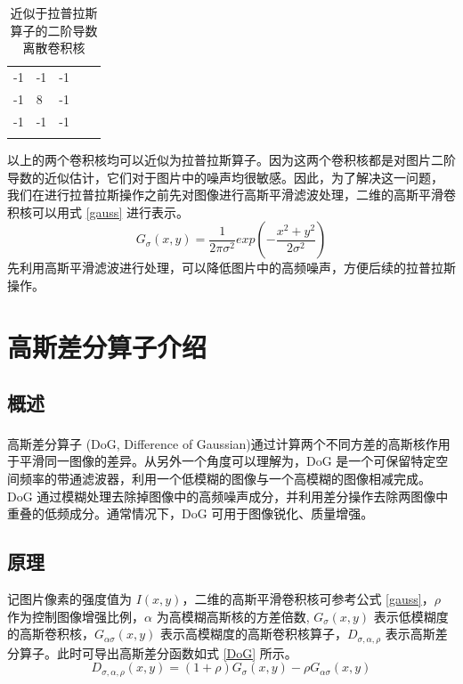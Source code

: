 \documentclass[12pt, a4paper, oneside]{ctexbook}
\begin{document}
	\begin{table}[h]
		\centering
		\begin{tabular}{lllll}
			\cline{1-3}
			\multicolumn{1}{|l|}{-1} & \multicolumn{1}{l|}{-1} & \multicolumn{1}{l|}{-1} &  &  \\ \cline{1-3}
			\multicolumn{1}{|l|}{-1} & \multicolumn{1}{l|}{8}  & \multicolumn{1}{l|}{-1} &  &  \\ \cline{1-3}
			\multicolumn{1}{|l|}{-1} & \multicolumn{1}{l|}{-1} & \multicolumn{1}{l|}{-1} &  &  \\ \cline{1-3}
			&                         &                         &  & 
		\end{tabular}
		\caption{近似于拉普拉斯算子的二阶导数离散卷积核}
	\end{table}
	以上的两个卷积核均可以近似为拉普拉斯算子。因为这两个卷积核都是对图片二阶导数的近似估计，它们对于图片中的噪声均很敏感。因此，为了解决这一问题，
	我们在进行拉普拉斯操作之前先对图像进行高斯平滑滤波处理，二维的高斯平滑卷积核可以用式 \ref{gauss} 进行表示。
	\begin{equation}	\label{gauss}
		G_\sigma (x,y)=\frac{1}{2\pi \sigma ^2} exp(-\frac{x^2+y^2}{2\sigma ^2}) 
	\end{equation}
	先利用高斯平滑滤波进行处理，可以降低图片中的高频噪声，方便后续的拉普拉斯操作。
	
	\section{高斯差分算子介绍}
		\subsection{概述}
		高斯差分算子 (DoG, Difference of Gaussian)\textsuperscript{\cite{14}\cite{15}}通过计算两个不同方差的高斯核作用于平滑同一图像的差异。从另外一个角度可以理解为，DoG 是一个可保留特定空间频率的带通滤波器，利用一个低模糊的图像与一个高模糊的图像相减完成。DoG 通过模糊处理去除掉图像中的高频噪声成分，并利用差分操作去除两图像中重叠的低频成分。通常情况下，DoG 可用于图像锐化、质量增强。
		\subsection{原理}
		记图片像素的强度值为 $I(x,y)$，二维的高斯平滑卷积核可参考公式 \ref{gauss}，$\rho$ 作为控制图像增强比例，$\alpha$ 为高模糊高斯核的方差倍数, $G_{\sigma}(x,y)$ 表示低模糊度的高斯卷积核，$G_{\alpha\sigma}(x,y)$ 表示高模糊度的高斯卷积核算子，$D_{\sigma,\alpha,\rho}$ 表示高斯差分算子。此时可导出高斯差分函数如式 \ref{DoG} 所示。
		\begin{equation} \label{DoG}
			D_{\sigma,\alpha,\rho}(x,y)=(1+\rho)G_{\sigma}(x,y)-\rho G_{\alpha\sigma}(x,y)
		\end{equation}
		
\end{document}

